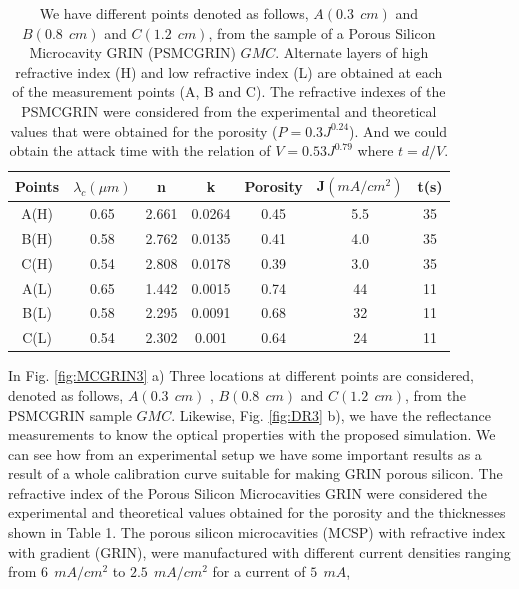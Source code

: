 \documentclass{article}
\begin{document}
\begin{table}
  \centering
  \begin{tabular}{|c|c|c|c|c|c|c|}
    \hline
    \textbf{Points} & $\lambda_c (\mu m)$ & \textbf{n} & \textbf{k} & \textbf{Porosity} & \textbf{J}$(mA/cm^2)$ & \textbf{t(s)}\\
    \hline
    A(H) & 0.65 & 2.661 & 0.0264 & 0.45 & 5.5 & 35 \\
    \hline
    B(H) & 0.58 & 2.762 & 0.0135 & 0.41 & 4.0 & 35 \\
    \hline
    C(H) & 0.54 & 2.808 & 0.0178 & 0.39 & 3.0 & 35 \\
    \hline
    A(L) & 0.65 & 1.442 & 0.0015 & 0.74 & 44 & 11 \\
    \hline
    B(L) & 0.58 & 2.295 & 0.0091 & 0.68 & 32 & 11 \\
    \hline
    C(L) & 0.54 & 2.302 & 0.001 & 0.64 & 24 & 11 \\
    \hline
  \end{tabular}
  \caption{We have different points denoted as follows, $ A
      (0.3 \ \ cm) $ and $ B (0.8 \ \ cm) $ and $ C (1.2 \ \ cm) $,
      from the sample of a Porous Silicon Microcavity GRIN
      (PSMCGRIN) $ GMC $. Alternate layers of high refractive index
      (H) and low refractive index (L) are obtained at each of the
      measurement points (A, B and C). The refractive indexes of the
      PSMCGRIN were considered from the experimental and theoretical
      values that were obtained for the porosity ($ P =
      0.3J^{0.24}$). And we could obtain the attack time with the
      relation of $ V = 0.53J ^ {0.79} $ where $ t = d / V $.}
	\label{tabla:1}
\end{table}
In Fig. \ref{fig:MCGRIN3} a) Three locations at different points are
considered, denoted as follows, $ A (0.3 \ \ cm) $ , $ B (0.8 \ \ cm)
$ and $ C (1.2 \ \ cm) $, from the PSMCGRIN sample $ GMC $. Likewise,
Fig. \ref{fig:DR3} b), we have the reflectance measurements to know
the optical properties with the proposed simulation. We can see how
from an experimental setup we have some important results as a result
of a whole calibration curve suitable for making GRIN porous
silicon. The refractive index of the Porous Silicon Microcavities GRIN
were considered the experimental and theoretical values obtained for
the porosity and the thicknesses shown in Table 1. The porous silicon
microcavities (MCSP) with refractive index with gradient (GRIN), were
manufactured with different current densities ranging from $ 6 \ \ mA
/ cm ^ 2 $ to $ 2.5 \ \ mA / cm ^ 2 $ for a current of $ 5 \ \ mA $,
\end{document}

